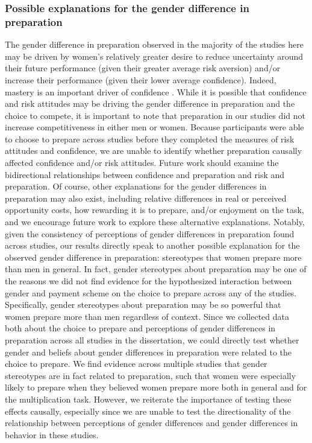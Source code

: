 \documentclass[a4paper, nobind]{templates/ociamthesis}
\begin{document}
\hypertarget{possible-explanations-for-the-gender-difference-in-preparation}{%
\subsubsection{Possible explanations for the gender difference in preparation}\label{possible-explanations-for-the-gender-difference-in-preparation}}

The gender difference in preparation observed in the majority of the studies here may be driven by women's relatively greater desire to reduce uncertainty around their future performance (given their greater average risk aversion) and/or increase their performance (given their lower average confidence). Indeed, mastery is an important driver of confidence \autocites[for review, see][]{Gist1992,Usher2008}. While it is possible that confidence and risk attitudes may be driving the gender difference in preparation and the choice to compete, it is important to note that preparation in our studies did not increase competitiveness in either men or women. Because participants were able to choose to prepare across studies before they completed the measures of risk attitudes and confidence, we are unable to identify whether preparation causally affected confidence and/or risk attitudes. Future work should examine the bidirectional relationships between confidence and preparation and risk and preparation. Of course, other explanations for the gender differences in preparation may also exist, including relative differences in real or perceived opportunity costs, how rewarding it is to prepare, and/or enjoyment on the task, and we encourage future work to explore these alternative explanations. Notably, given the consistency of perceptions of gender differences in preparation found across studies, our results directly speak to another possible explanation for the observed gender difference in preparation: stereotypes that women prepare more than men in general. In fact, gender stereotypes about preparation may be one of the reasons we did not find evidence for the hypothesized interaction between gender and payment scheme on the choice to prepare across any of the studies. Specifically, gender stereotypes about preparation may be so powerful that women prepare more than men regardless of context. Since we collected data both about the choice to prepare and perceptions of gender differences in preparation across all studies in the dissertation, we could directly test whether gender and beliefs about gender differences in preparation were related to the choice to prepare. We find evidence across multiple studies that gender stereotypes are in fact related to preparation, such that women were especially likely to prepare when they believed women prepare more both in general and for the multiplication task. However, we reiterate the importance of testing these effects causally, especially since we are unable to test the directionality of the relationship between perceptions of gender differences and gender differences in behavior in these studies.
\end{document}
